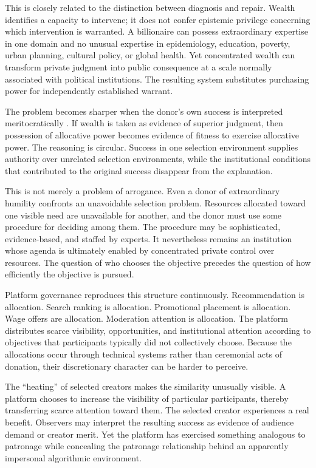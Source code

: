 \documentclass[11pt]{article}
\begin{document}
This is closely related to the distinction between diagnosis and repair. Wealth identifies a capacity to intervene; it does not confer epistemic privilege concerning which intervention is warranted. A billionaire can possess extraordinary expertise in one domain and no unusual expertise in epidemiology, education, poverty, urban planning, cultural policy, or global health. Yet concentrated wealth can transform private judgment into public consequence at a scale normally associated with political institutions. The resulting system substitutes purchasing power for independently established warrant.

The problem becomes sharper when the donor's own success is interpreted meritocratically \parencite{sandel2020tyranny,frank2016success,merton1968matthew}. If wealth is taken as evidence of superior judgment, then possession of allocative power becomes evidence of fitness to exercise allocative power. The reasoning is circular. Success in one selection environment supplies authority over unrelated selection environments, while the institutional conditions that contributed to the original success disappear from the explanation.

This is not merely a problem of arrogance. Even a donor of extraordinary humility confronts an unavoidable selection problem. Resources allocated toward one visible need are unavailable for another, and the donor must use some procedure for deciding among them. The procedure may be sophisticated, evidence-based, and staffed by experts. It nevertheless remains an institution whose agenda is ultimately enabled by concentrated private control over resources. The question of who chooses the objective precedes the question of how efficiently the objective is pursued.

Platform governance reproduces this structure continuously. Recommendation is allocation. Search ranking is allocation. Promotional placement is allocation. Wage offers are allocation. Moderation attention is allocation. The platform distributes scarce visibility, opportunities, and institutional attention according to objectives that participants typically did not collectively choose. Because the allocations occur through technical systems rather than ceremonial acts of donation, their discretionary character can be harder to perceive.

The ``heating'' of selected creators makes the similarity unusually visible. A platform chooses to increase the visibility of particular participants, thereby transferring scarce attention toward them. The selected creator experiences a real benefit. Observers may interpret the resulting success as evidence of audience demand or creator merit. Yet the platform has exercised something analogous to patronage while concealing the patronage relationship behind an apparently impersonal algorithmic environment.
\end{document}
